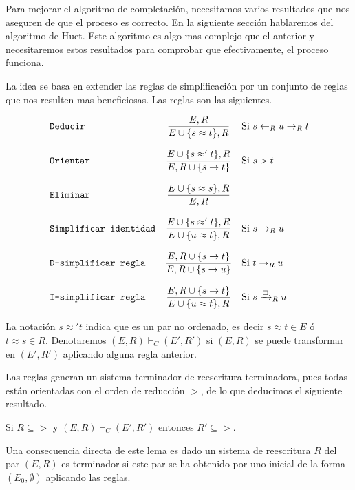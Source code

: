Para mejorar el algoritmo de completación, necesitamos varios
resultados que nos aseguren de que el proceso es correcto. En la
siguiente sección hablaremos del algoritmo de Huet. Este algoritmo es
algo mas complejo que el anterior y necesitaremos estos resultados
para comprobar que efectivamente, el proceso funciona.

La idea se basa en extender las reglas de simplificación por un
conjunto de reglas que nos resulten mas beneficiosas. Las reglas son
las siguientes.

\[
  \begin{array}{lcl}
    $\texttt{Deducir} $ & \dfrac{E,R}{E \cup \{s \approx t \}, R} & $Si $ s \leftarrow_R u \rightarrow_R t \\ \\
    $\texttt{Orientar}$ & \dfrac{E \cup \{s \approx' t\},R}{E,R \cup \{s \rightarrow t\}} & $Si $ s > t \\ \\
    $\texttt{Eliminar}$ & \dfrac{E \cup \{s \approx s\}, R}{E,R} & \\ \\
    $\texttt{Simplificar identidad}$   & \dfrac{E \cup \{ s\approx' t\},R}{E \cup \{ u \approx t\},R} & $Si $ s \rightarrow_R u\\ \\
    $\texttt{D-simplificar regla}$    & \dfrac{E, R \cup \{s \rightarrow t \} }{E,R \cup \{s \rightarrow u\}} & $Si $ t \rightarrow_R u   \\ \\
    $\texttt{I-simplificar regla}$    & \dfrac{E, R \cup \{s \rightarrow t \} }{E \cup \{u \approx t \}, R} & $Si $ s \xrightarrow{\sqsupset}_R u
  \end{array} 
\]

La notación $s \approx' t$ indica que es un par no ordenado, es decir
$s \approx t \in E$ ó $t \approx s \in R$. Denotaremos
$(E,R) \vdash_C (E',R')$ si $(E,R)$ se puede transformar en $(E', R')$
aplicando alguna regla anterior.

Las reglas generan un sistema terminador de reescritura terminadora,
pues todas están orientadas con el orden de reducción $>$, de lo que
deducimos el siguiente resultado.

\begin{lema}
 Si $R \subseteq >$ y $(E,R) \vdash_C (E',R')$ entonces $R' \subseteq >$.
\end{lema}

Una consecuencia directa de este lema es dado un sistema de
reescritura $R$ del par $(E,R)$ es terminador si este par se ha
obtenido por uno inicial de la forma $(E_0, \emptyset)$ aplicando las reglas.

